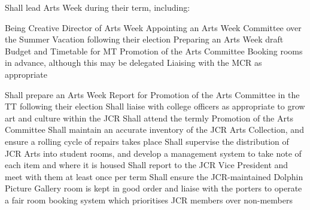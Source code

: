 Shall lead Arts Week during their term, including:\begin{enumerate}
Being Creative Director of Arts Week
Appointing an Arts Week Committee over the Summer Vacation following their election
Preparing an Arts Week draft Budget and Timetable for MT Promotion of the Arts Committee
Booking rooms in advance, although this may be delegated
Liaising with the MCR as appropriate\end{enumerate}
Shall prepare an Arts Week Report for Promotion of the Arts Committee in the TT following their election
Shall liaise with college officers as appropriate to grow art and culture within the JCR
Shall attend the termly Promotion of the Arts Committee 
Shall maintain an accurate inventory of the JCR Arts Collection, and ensure a rolling cycle of repairs takes place
Shall supervise the distribution of JCR Arts into student rooms, and develop a management system to take note of each item and where it is housed
Shall report to the JCR Vice President and meet with them at least once per term
Shall ensure the JCR-maintained Dolphin Picture Gallery room is kept in good order and liaise with the porters to operate a fair room booking system which prioritises JCR members over non-members
